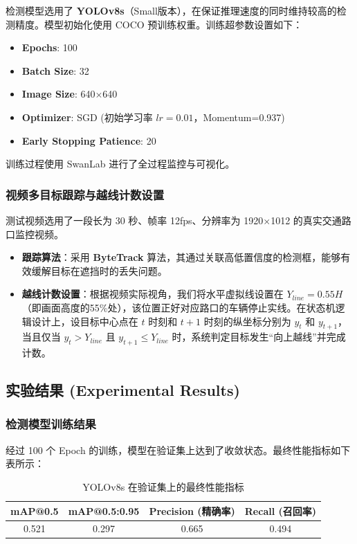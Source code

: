 \documentclass{article}
\begin{document}
检测模型选用了 \textbf{YOLOv8s}（Small版本），在保证推理速度的同时维持较高的检测精度。模型初始化使用 COCO 预训练权重。训练超参数设置如下：
\begin{itemize}
    \item \textbf{Epochs}: 100
    \item \textbf{Batch Size}: 32
    \item \textbf{Image Size}: 640$\times$640
    \item \textbf{Optimizer}: SGD (初始学习率 $lr=0.01$，Momentum=0.937)
    \item \textbf{Early Stopping Patience}: 20
\end{itemize}
训练过程使用 SwanLab 进行了全过程监控与可视化。

\subsubsection{视频多目标跟踪与越线计数设置}
测试视频选用了一段长为 30 秒、帧率 12fps、分辨率为 1920$\times$1012 的真实交通路口监控视频。
\begin{itemize}
    \item \textbf{跟踪算法}：采用 \textbf{ByteTrack} 算法，其通过关联高低置信度的检测框，能够有效缓解目标在遮挡时的丢失问题。
    \item \textbf{越线计数设置}：根据视频实际视角，我们将水平虚拟线设置在 $Y_{line} = 0.55H$（即画面高度的55\%处），该位置正好对应路口的车辆停止实线。在状态机逻辑设计上，设目标中心点在 $t$ 时刻和 $t+1$ 时刻的纵坐标分别为 $y_t$ 和 $y_{t+1}$，当且仅当 $y_t > Y_{line}$ 且 $y_{t+1} \leq Y_{line}$ 时，系统判定目标发生“向上越线”并完成计数。
\end{itemize}

\subsection{实验结果 (Experimental Results)}

\subsubsection{检测模型训练结果}
经过 100 个 Epoch 的训练，模型在验证集上达到了收敛状态。最终性能指标如下表所示：

\begin{table}[H]
\centering
\begin{tabular}{@{}cccc@{}}
\toprule
\textbf{mAP@0.5} & \textbf{mAP@0.5:0.95} & \textbf{Precision (精确率)} & \textbf{Recall (召回率)} \\ \midrule
0.521            & 0.297                 & 0.665                        & 0.494                     \\ \bottomrule
\end{tabular}
\caption{YOLOv8s 在验证集上的最终性能指标}
\end{table}
\end{document}
